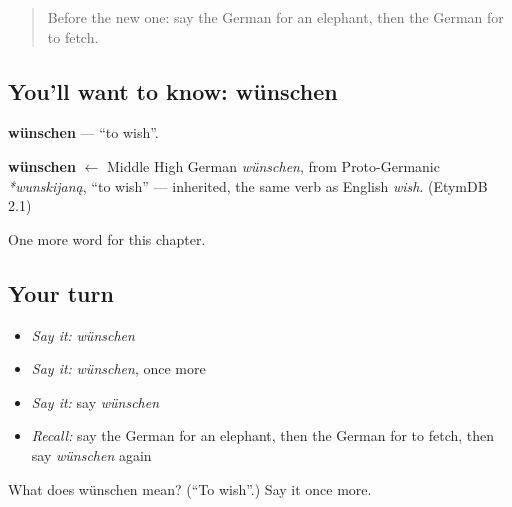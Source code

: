 \label{lesson:GE-C88-wuenschen}



\begin{quote}
Before the new one: say the German for an elephant, then the German for to fetch.
\end{quote}

\subsection*{You'll want to know: wünschen}
\textbf{wünschen} — \textquotedblleft{}to wish\textquotedblright{}.

\begin{cousinweb}
\textbf{wünschen} $\leftarrow$ Middle High German \emph{wünschen}, from Proto-Germanic \emph{*wunskijaną}, \textquotedblleft{}to wish\textquotedblright{} — inherited, the same verb as English \emph{wish}. (EtymDB 2.1)
\end{cousinweb}

\begin{grammarlens}[title={What you've built}]
One more word for this chapter.
\end{grammarlens}

\subsection*{Your turn}
\begin{itemize}
\raggedright
  \item \emph{Say it:} \emph{wünschen}
  \item \emph{Say it:} \emph{wünschen}, once more
  \item \emph{Say it:} say \emph{wünschen}
  \item \emph{Recall:} say the German for an elephant, then the German for to fetch, then say \emph{wünschen} again
\end{itemize}

\begin{tcolorbox}[breakable,colback=teal!4,colframe=teal!35!black,title={Before you move on}]
What does wünschen mean? (\textquotedblleft{}To wish\textquotedblright{}.) Say it once more.
\end{tcolorbox}
